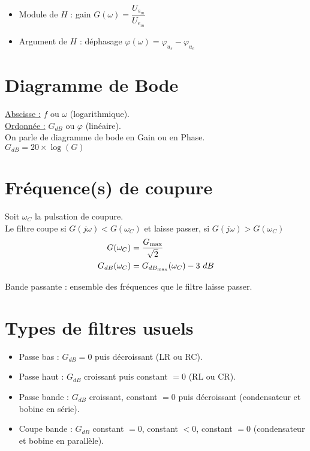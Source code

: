 \documentclass[13pt, twoside, a4paper, french]{report}
\begin{document}
    \begin{itemize}
        \item Module de $H$ : gain $G(\omega) = \dfrac{U_s_m}{U_e_m}$
        \item Argument de $H$ : déphasage $\varphi(\omega) = \varphi_{u_s} - \varphi_{u_e}$
    \end{itemize}

    \section{Diagramme de Bode}\label{sec:diagramme-de-bode}

    \underline{Abscisse :} $f$ ou $\omega$ (logarithmique).\\
    \underline{Ordonnée :} $G_{dB}$ ou $\varphi$ (linéaire).\\
    On parle de diagramme de bode en Gain ou en Phase.\\

    $G_{dB} = 20 \times \log(G)$

    \section{Fréquence(s) de coupure}\label{sec:frequence-s-de-coupure}

    Soit $\omega_C$ la pulsation de coupure.\\
    Le filtre coupe si $G(j\omega) < G(\omega_C)$ et laisse passer, si $G(j\omega) > G(\omega_C)$
    \begin{align*}
        G(\omega_C) &= \dfrac{G_{\max}}{\sqrt{2}}\\
        G_{dB}(\omega_C) &= G_{dB_\textrm{max}}(\omega_C) - 3\ dB
    \end{align*}

    Bande passante : ensemble des fréquences que le filtre laisse passer.

    \section{Types de filtres usuels}\label{sec:types-de-filtres-usuels}

    \begin{itemize}
        \item Passe bas : $G_{dB} = 0$ puis décroissant (LR ou RC).
        \item Passe haut : $G_{dB}$ croissant puis constant $= 0$ (RL ou CR).
        \item Passe bande : $G_{dB}$ croissant, constant $= 0$ puis décroissant (condensateur et bobine en série).
        \item Coupe bande : $G_{dB}$ constant $= 0$, constant $< 0$, constant $= 0$ (condensateur et bobine en parallèle).
    \end{itemize}
\end{document}
